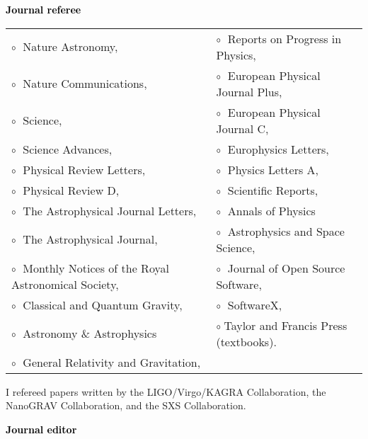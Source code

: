 \textbf{\textcolor{black}{Journal referee}}\vspace{0.1cm}\\
\begin{tabular}{@{\hskip 0.4cm}l@{\hskip 0.4in}l}
$\circ\;$ Nature Astronomy,  & $\circ\;$   Reports on Progress in Physics,  \\
$\circ\;$ Nature Communications,  & $\circ\;$   European Physical Journal Plus,   \\
$\circ\;$ Science, & $\circ\;$ European Physical Journal C,  \\
$\circ\;$ Science Advances, & $\circ\;$  Europhysics Letters, \\
$\circ\;$ Physical Review Letters, & $\circ\;$  Physics Letters A, \\
$\circ\;$ Physical Review D,  & $\circ\;$   Scientific Reports, \\
$\circ\;$  The Astrophysical Journal Letters,  &  $\circ\;$ Annals of Physics \\
$\circ\;$ The Astrophysical Journal,  &  $\circ\;$ Astrophysics and Space Science, \\
$\circ\;$  Monthly Notices of the Royal Astronomical Society, & $\circ\;$ Journal of Open Source Software,  \\
$\circ\;$  Classical and Quantum Gravity, & $\circ\;$ SoftwareX, \\
$\circ\;$  Astronomy \& Astrophysics & $\circ\;$Taylor and Francis Press (textbooks).  \\
$\circ\;$  General Relativity and Gravitation, & %
\end{tabular}

\vspace{0.2cm}

I refereed papers written by the LIGO/Virgo/KAGRA Collaboration, the NanoGRAV Collaboration, and the SXS Collaboration.


\vspace{0.2cm}




 \textbf{\textcolor{black}{Journal editor}}\vspace{0.1cm}\\
 \vspace{-0.1cm}
\vspace{0.2cm}


